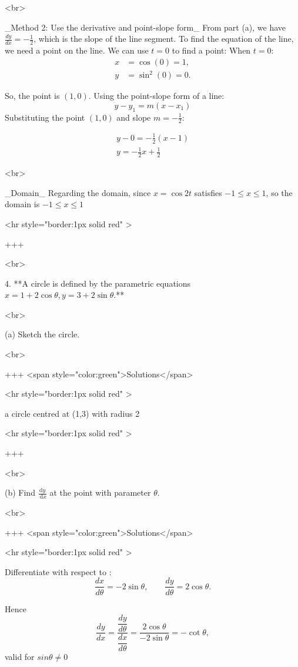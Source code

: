 <br>


_Method 2: Use the derivative and point-slope form_
From part (a), we have $\frac{dy}{dx} = -\frac{1}{2}$, which is the slope of the line segment. To find the equation of the line, we need a point on the line. We can use $t=0$ to find a point:
When $t=0$:
\begin{align*}
x &= \cos(0) = 1, \\
y &= \sin^2(0) = 0.
\end{align*}

So, the point is $(1, 0)$. Using the point-slope form of a line:
$$
y - y_1 = m(x - x_1)
$$
Substituting the point $(1, 0)$ and slope $m = -\frac{1}{2}$:

$$
\begin{align*}
y - 0 = -\frac{1}{2}(x - 1)\\
y = -\frac{1}{2}x  + \frac{1}{2}
\end{align*}
$$

<br>

_Domain_
Regarding the domain, since $x=\cos 2t$ satisfies $-1\le x\le 1$, so the domain is $-1\le x\le 1$

<hr style="border:1px solid red" >

+++

<br>

4. **A circle is defined by the parametric equations $x=1+2 \cos \theta, y=3+2 \sin \theta$.**

<br>

(a) Sketch the circle.

<br>

+++ <span style="color:green">Solutions</span>

<hr style="border:1px solid red" >

a circle centred at (1,3) with radius 2

<hr style="border:1px solid red" >

+++

<br>


(b) Find $\frac{\mathrm{d} y}{\mathrm{~d} x}$ at the point with parameter $\theta$.

<br>

+++ <span style="color:green">Solutions</span>

<hr style="border:1px solid red" >

Differentiate with respect to \theta:
$$
\frac{dx}{d\theta} = -2\sin\theta,\qquad \frac{dy}{d\theta} = 2\cos\theta.
$$

Hence
$$
\frac{dy}{dx}=\frac{\dfrac{dy}{d\theta}}{\dfrac{dx}{d\theta}}=\frac{2\cos\theta}{-2\sin\theta}=-\cot\theta,
$$
valid for $sinθ \neq 0$

